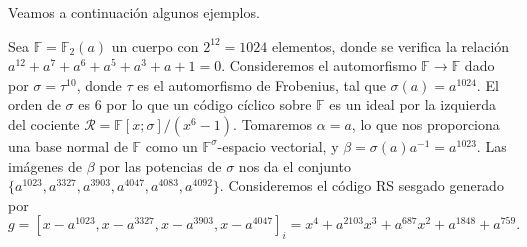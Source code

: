 Veamos a continuación algunos ejemplos.

\begin{example}
  Sea \(\mathbb F = \mathbb F_2(a)\) un cuerpo con \(2^{12} = 1024\) elementos, donde se verifica la relación \(a^{12} + a^7 + a^{6} + a^{5} + a^{3} + a + 1 = 0\).
  Consideremos el automorfismo \(\mathbb F \to \mathbb F\) dado por \(\sigma = \tau^{10}\), donde \(\tau\) es el automorfismo de Frobenius, tal que \(\sigma(a) = a^{1024}\).
  El orden de \(\sigma\) es \(6\) por lo que un código cíclico sobre \(\mathbb F\) es un ideal por la izquierda del cociente \(\mathcal R = \mathbb F[x; \sigma]/(x^{6} - 1)\).
  Tomaremos \(\alpha = a\), lo que nos proporciona una base normal de \(\mathbb F\) como un \(\mathbb F^{\sigma}\)-espacio vectorial, y \(\beta = \sigma(a)a^{-1} = a^{1023}\).
  Las imágenes de \(\beta\) por las potencias de \(\sigma\) nos da el conjunto \(\{a^{1023}, a^{3327}, a^{3903}, a^{4047}, a^{4083}, a^{4092}\}\).
  Consideremos el código RS sesgado generado por
  \[
    g = \left[x - a^{1023}, x - a^{3327}, x - a^{3903}, x - a^{4047}\right]_i = x^4 + a^{2103}x^3 + a^{687}x^2 + a^{1848} + a^{759}.
  \]
\end{example}